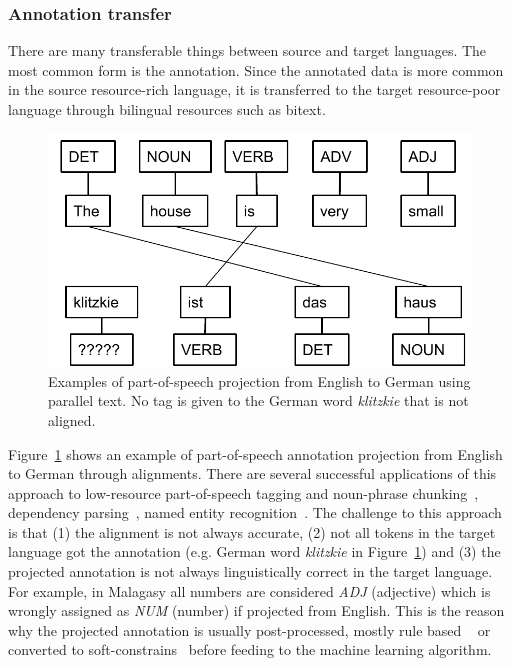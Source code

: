 \documentclass[12pt,twoside,final,hidelinks]{ltthesis}
\theoremstyle{definition}
\begin{document}
\subsubsection{Annotation transfer}
There are many transferable things between source and target languages. The most common 
form is the annotation. Since the annotated data is more common in the source resource-rich language, it is transferred to the target resource-poor language through bilingual resources such as bitext.
\begin{figure}
\centering
\includegraphics[scale=0.5]{Figures/LabelProjection}
\caption[Part-of-speech projection examples]{Examples of part-of-speech projection from English to German using parallel text. No tag is given to the German word \textit{klitzkie} that is not aligned.}
\label{fig:projection_example_en_de}
\end{figure}
Figure~\ref{fig:projection_example_en_de} shows an example of part-of-speech annotation projection from English to German through alignments. 
There are several successful applications of this approach to low-resource part-of-speech tagging and noun-phrase chunking~\cite{YarowskyAndNgai}, dependency parsing~\cite{Hwa:2005:BPV}, named entity recognition~\cite{wang-che-manning:2013:ACL2013}.
The challenge to this approach is that (1) the alignment is not always accurate, (2) not all 
tokens in the target language got the annotation (e.g. German word \textit{klitzkie} in Figure~\ref{fig:projection_example_en_de}) and (3) 
the projected annotation is not always linguistically correct in the target language. For 
example, in Malagasy all numbers are considered \textit{ADJ} (adjective) which is wrongly assigned as \textit{NUM} (number) if projected from English. 
This is the reason why the projected annotation is usually post-processed, mostly rule based ~\cite{Hwa:2005:BPV} or converted to soft-constrains~\cite{Das:2011,TackstromDPMN13} before feeding to the machine learning algorithm. 
\end{document}
